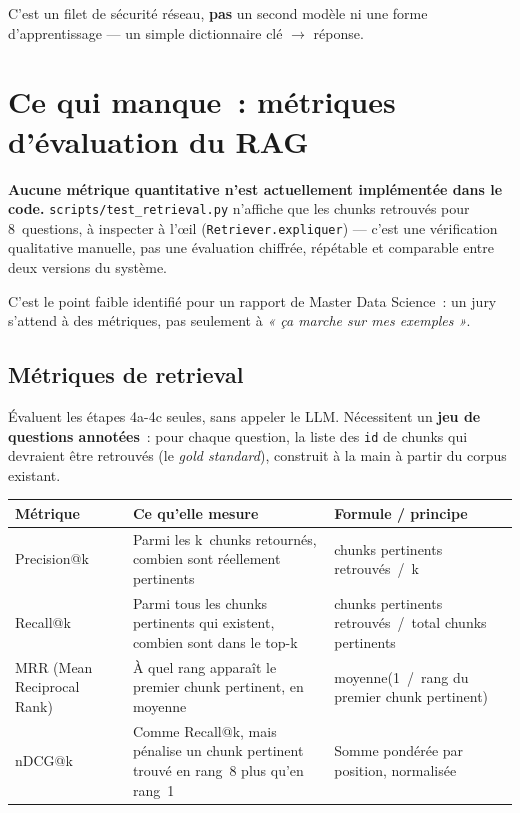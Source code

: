 \documentclass[11pt]{article}
\begin{document}
C'est un filet de sécurité réseau, \textbf{pas} un second modèle ni une forme d'apprentissage ---
un simple dictionnaire clé $\rightarrow$ réponse.

\section{Ce qui manque~: métriques d'évaluation du RAG}

\textbf{Aucune métrique quantitative n'est actuellement implémentée dans le code.}
\texttt{scripts/test\_retrieval.py} n'affiche que les chunks retrouvés pour 8~questions, à
inspecter à l'œil (\texttt{Retriever.expliquer}) --- c'est une vérification qualitative manuelle,
pas une évaluation chiffrée, répétable et comparable entre deux versions du système.

C'est le point faible identifié pour un rapport de Master Data Science~: un jury s'attend à des
métriques, pas seulement à \textit{« ça marche sur mes exemples »}.

\subsection{Métriques de retrieval}

Évaluent les étapes 4a-4c seules, sans appeler le LLM. Nécessitent un \textbf{jeu de questions
annotées}~: pour chaque question, la liste des \texttt{id} de chunks qui devraient être retrouvés
(le \textit{gold standard}), construit à la main à partir du corpus existant.

\begin{tabularx}{\textwidth}{@{}l Y Y@{}}
\toprule
\textbf{Métrique} & \textbf{Ce qu'elle mesure} & \textbf{Formule / principe} \\
\midrule
Precision@k & Parmi les k~chunks retournés, combien sont réellement pertinents & chunks pertinents retrouvés~/~k \\
Recall@k & Parmi tous les chunks pertinents qui existent, combien sont dans le top-k & chunks pertinents retrouvés~/~total chunks pertinents \\
MRR (Mean Reciprocal Rank) & À quel rang apparaît le premier chunk pertinent, en moyenne & moyenne(1~/~rang du premier chunk pertinent) \\
nDCG@k & Comme Recall@k, mais pénalise un chunk pertinent trouvé en rang~8 plus qu'en rang~1 & Somme pondérée par position, normalisée \\
\bottomrule
\end{tabularx}
\end{document}
